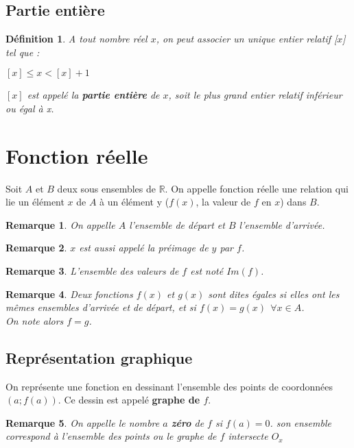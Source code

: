 \documentclass[12pt, a4paper]{book}
\newtheorem*{definition}{Définition}
\newtheorem*{remarque}{Remarque}
\begin{document}
\subsection{Partie entière}
\begin{definition}
    A tout nombre réel $x$, on peut associer un unique entier relatif [$x$] tel que :
    \begin{center}
        $[x] \leq x < [x]+1$
    \end{center}
    $[x]$ est appelé la \textbf{partie entière} de $x$, soit le plus grand entier relatif inférieur ou égal à x.
\end{definition}
\newpage
\section{Fonction réelle}
Soit $A$ et $B$ deux sous ensembles de $\mathbb{R}$. On appelle fonction réelle une relation qui lie un élément $x$ de $A$ à un élément y ($f(x)$, la valeur de $f$ en $x$) dans $B$.

\begin{remarque}
    On appelle $A$ l'ensemble de départ et $B$ l'ensemble d'arrivée.
\end{remarque}
\begin{remarque}
    $x$ est aussi appelé la préimage de $y$ par $f$.
\end{remarque}
\begin{remarque}
L'ensemble des valeurs de $f$ est noté $Im(f)$.
\end{remarque}
\begin{remarque}
    Deux fonctions $f(x)$ et $g(x)$ sont dites égales si elles ont les mêmes ensembles d'arrivée et de départ, et si $f(x) = g(x)\ \ \forall x \in A$.\\
    On note alors $f = g$.\\
\end{remarque}
\subsection{Représentation graphique}

    On représente une fonction en dessinant l'ensemble des points de coordonnées $(a;f(a))$. Ce dessin est appelé \textbf{graphe de $f$}.

\begin{remarque}
    On appelle le nombre $a$ \textbf{zéro} de $f$ si $f(a)=0$. son ensemble correspond à l'ensemble des points ou le graphe de $f$ intersecte $O_x$
\end{remarque}
\newpage
\end{document}
